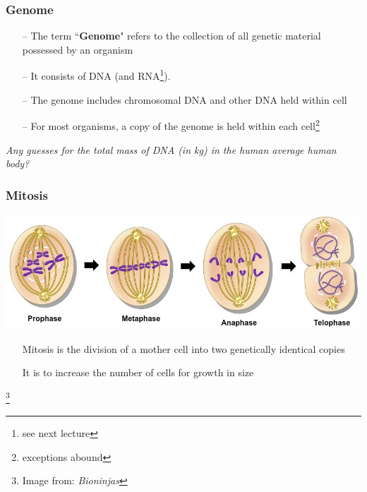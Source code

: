 \documentclass{beamer}
\newcommand\blfootnote[1]{%
	\begingroup
	\renewcommand\thefootnote{}\footnote{#1}%
	\addtocounter{footnote}{-1}%
	\endgroup
}
\begin{document}
	
	\begin{frame}
		\frametitle{Genome}
		\begin{itemize}
		
		\item[--] The term ``\textbf{Genome}" refers to the collection of all genetic material possessed by an organism
		
		\item[-- ] It consists of DNA (and RNA\footnote[1]{see next lecture}). 
		
		\item[--] The genome includes chromosomal DNA and other DNA held within cell

		\item[--] For most organisms, a copy of the genome is held within each cell\footnote[2]{exceptions abound} \pause
		\end{itemize}

	\textit{Any guesses for the total mass of DNA (in kg) in the human average human body?}
	\end{frame}
	
	\begin{frame}
		\frametitle{Mitosis}
						\centering \includegraphics[keepaspectratio, width  =\textwidth]{img/mitosis}  \\
						\begin{itemize}

						\item[] Mitosis is the division of a mother cell into two genetically identical copies 
						\item[] It is to increase the number of cells for growth in size
						
						
						\end{itemize}
\blfootnote{Image from: \textit{Bioninjas}}
	\end{frame}
	
\end{document}
